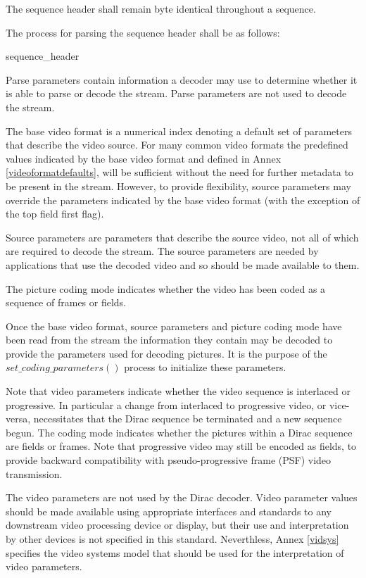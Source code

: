 The sequence header shall remain byte identical throughout a sequence.

The process for parsing the sequence header shall be as follows:

\begin{pseudo}{sequence\_header}{}
\bsRET{\VideoParams}
\end{pseudo}

Parse parameters contain information a decoder may use to determine whether 
it is able to parse or decode the stream. Parse parameters are not used to decode the stream.

The base video format is a numerical index denoting a default set of parameters 
that describe the video source. For many common video formats the predefined 
values indicated by the base video format and defined in Annex \ref{videoformatdefaults}, will be sufficient 
without the need for further metadata to be present in the stream. However, to provide 
flexibility, source parameters may override the parameters indicated 
by the base video format (with the exception of the top field first flag).

Source parameters are parameters that describe the source video, not all of 
which are required to decode the stream. The source parameters are needed by 
applications that use the decoded video and so should be made available to them.

The picture coding mode indicates whether the video has been coded as a sequence 
of frames or fields.

Once the base video format, source parameters and picture coding mode have 
been read from the stream the information they contain may be decoded to 
provide the parameters used for decoding pictures. It is the purpose of the 
$set\_coding\_parameters()$ process to initialize these parameters.

\begin{informative}
Note that video parameters indicate whether the video sequence is interlaced or progressive.
In particular a change from interlaced to progressive video, or vice-versa, necessitates that
the Dirac sequence be terminated and a new sequence begun. The coding mode indicates whether
the pictures within a Dirac sequence are fields or frames. Note that progressive video may
still be encoded as fields, to provide backward compatibility with pseudo-progressive frame (PSF)
video transmission.

The video parameters are not used by the Dirac decoder. Video parameter values should
be made available using appropriate interfaces and standards to any downstream video
processing device or display, but their use and interpretation by other devices is not specified in this standard. 
Neverthless, Annex \ref{vidsys} specifies the video systems model that should be used for the interpretation
of video parameters.
\end{informative}

